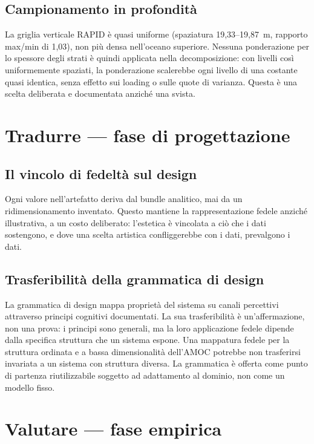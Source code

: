 \subsection*{Campionamento in profondità}
La griglia verticale RAPID è quasi uniforme (spaziatura 19,33--19,87~m, rapporto max/min di 1,03), non più densa nell'oceano superiore. Nessuna ponderazione per lo spessore degli strati è quindi applicata nella decomposizione: con livelli così uniformemente spaziati, la ponderazione scalerebbe ogni livello di una costante quasi identica, senza effetto sui loading o sulle quote di varianza. Questa è una scelta deliberata e documentata anziché una svista.

\section{Tradurre --- fase di progettazione}
\label{app:limits-translate}

\subsection*{Il vincolo di fedeltà sul design}
Ogni valore nell'artefatto deriva dal bundle analitico, mai da un ridimensionamento inventato. Questo mantiene la rappresentazione fedele anziché illustrativa, a un costo deliberato: l'estetica è vincolata a ciò che i dati sostengono, e dove una scelta artistica confliggerebbe con i dati, prevalgono i dati.

\subsection*{Trasferibilità della grammatica di design}
La grammatica di design mappa proprietà del sistema su canali percettivi attraverso principi cognitivi documentati. La sua trasferibilità è un'affermazione, non una prova: i principi sono generali, ma la loro applicazione fedele dipende dalla specifica struttura che un sistema espone. Una mappatura fedele per la struttura ordinata e a bassa dimensionalità dell'AMOC potrebbe non trasferirsi invariata a un sistema con struttura diversa. La grammatica è offerta come punto di partenza riutilizzabile soggetto ad adattamento al dominio, non come un modello fisso.

\section{Valutare --- fase empirica}
\label{app:limits-evaluate}

